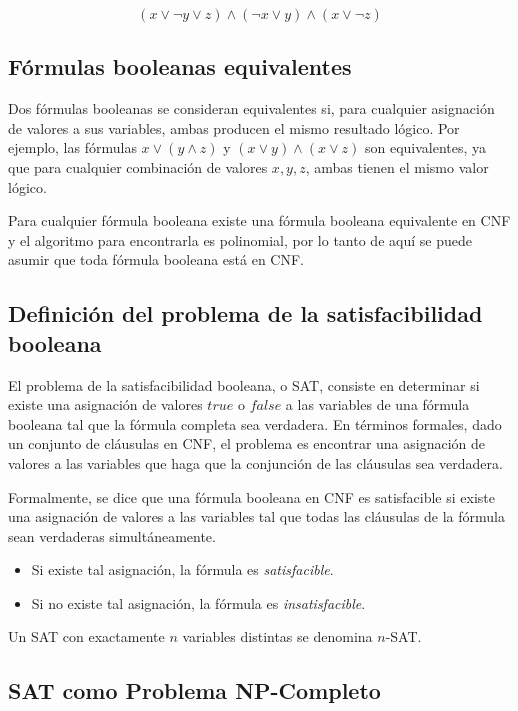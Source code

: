 \documentclass{article}
\begin{document}
\[
      (x \vee \neg y \vee z) \wedge (\neg x \vee y) \wedge (x \vee \neg z)
\]

\subsection{Fórmulas booleanas equivalentes}

Dos fórmulas booleanas se consideran equivalentes si, para cualquier asignación de valores a sus variables, ambas producen el mismo resultado lógico. Por ejemplo, las fórmulas \( x \vee (y \wedge z) \) y \( (x \vee y) \wedge (x \vee z) \) son equivalentes, ya que para cualquier combinación de valores \( x, y, z \), ambas tienen el mismo valor lógico.

Para cualquier fórmula booleana existe una fórmula booleana equivalente en CNF y el algoritmo para encontrarla es polinomial, por lo tanto
de aquí se puede asumir que toda fórmula booleana está en CNF.

\subsection{Definición del problema de la satisfacibilidad booleana}

El problema de la satisfacibilidad booleana, o SAT, consiste en determinar si existe una asignación de valores \( true \) o \( false \) a las variables de una fórmula booleana tal que la fórmula completa sea verdadera. En términos formales, dado un conjunto de cláusulas en CNF, el problema es encontrar una asignación de valores a las variables que haga que la conjunción de las cláusulas sea verdadera.

Formalmente, se dice que una fórmula booleana en CNF es satisfacible si existe una asignación de valores a las variables tal que todas las cláusulas de la fórmula sean verdaderas simultáneamente.

\begin{itemize}
      \item Si existe tal asignación, la fórmula es \textit{satisfacible}.
      \item Si no existe tal asignación, la fórmula es \textit{insatisfacible}.
\end{itemize}

Un SAT con exactamente $n$ variables distintas se denomina $n$-SAT.

\subsection{SAT como Problema NP-Completo}
\end{document}
